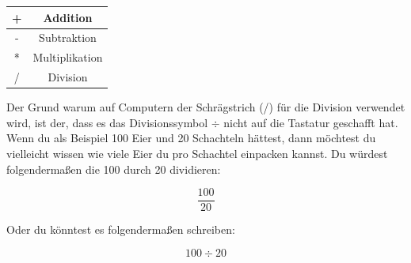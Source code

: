 \begin{center}
\begin{tabular}{|c|c|}
\hline
+ & Addition \\
\hline
- & Subtraktion \\
\hline
* & Multiplikation \\
\hline
/ & Division \\
\hline
\end{tabular}
\end{center}

Der Grund warum auf Computern der Schrägstrich (/) für die Division verwendet wird, ist der, dass es das Divisionssymbol $\div$ nicht auf die Tastatur geschafft hat. Wenn du als Beispiel 100 Eier und 20 Schachteln hättest, dann möchtest du vielleicht wissen wie viele Eier du pro Schachtel einpacken kannst. Du würdest folgendermaßen die 100 durch 20 dividieren:

\begin{displaymath}
\frac{100}{20}
\end{displaymath}



Oder du könntest es folgendermaßen schreiben:

\begin{displaymath}
100 \div 20
\end{displaymath}

